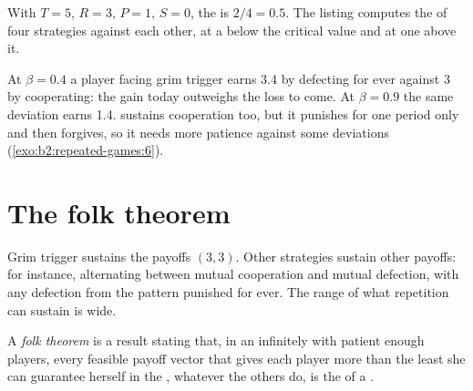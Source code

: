 With $T = 5$, $R = 3$, $P = 1$, $S = 0$, the  is $2/4 = 0.5$. The listing computes the  of four strategies against each other, at a  below the critical value and at one
above it.

\label{lst:b2:repeated-games:pd}

\label{out:b2:repeated-games:pd}

At $\beta = 0.4$ a player facing grim trigger earns 3.4 by defecting for ever against 3 by cooperating: the gain
today outweighs the loss to come. At $\beta = 0.9$ the same deviation earns 1.4.  sustains cooperation
too, but it punishes for one period only and then forgives, so it needs more patience against some
deviations (\cref{exo:b2:repeated-games:6}).

\section{The folk theorem}\label{sec:b2:repeated-games:folk}

Grim trigger sustains the payoffs $(3, 3)$. Other strategies sustain other payoffs: for instance, alternating
between mutual cooperation and mutual defection, with any defection from the pattern punished for ever. The
range of what repetition can sustain is wide.

\begin{definition}\label{def:b2:repeated-games:folk-theorem}
A \emph{folk theorem} is a result stating that, in an infinitely  with patient
enough players, every feasible payoff vector that gives each player more than the least she can guarantee
herself in the , whatever the others do, is the  of a .
\end{definition}

